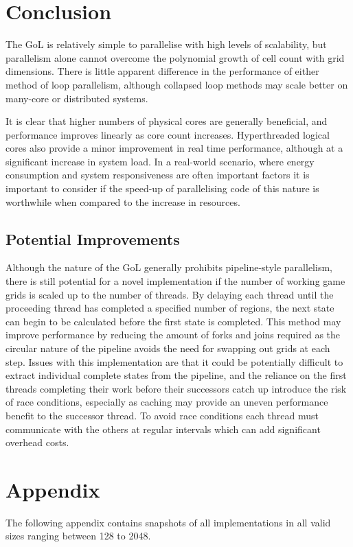 \documentclass[]{article}
\begin{document}
\section{Conclusion}
The GoL is relatively simple to parallelise with high levels of scalability, but parallelism alone cannot overcome the polynomial growth of cell count with grid dimensions. There is little apparent difference in the performance of either method of loop parallelism, although collapsed loop methods may scale better on many-core or distributed systems.

It is clear that higher numbers of physical cores are generally beneficial, and performance improves linearly as core count increases. Hyperthreaded logical cores also provide a minor improvement in real time performance, although at a significant increase in system load. In a real-world scenario, where energy consumption and system responsiveness are often important factors it is important to consider if the speed-up of parallelising code of this nature is worthwhile when compared to the increase in resources.

\subsection{Potential Improvements}
Although the nature of the GoL generally prohibits pipeline-style parallelism, there is still potential for a novel implementation if the number of working game grids is scaled up to the number of threads. By delaying each thread until the proceeding thread has completed a specified number of regions, the next state can begin to be calculated before the first state is completed. This method may improve performance by reducing the amount of forks and joins required as the circular nature of the pipeline avoids the need for swapping out grids at each step. Issues with this implementation are that it could be potentially difficult to extract individual complete states from the pipeline, and the reliance on the first threads completing their work before their successors catch up introduce the risk of race conditions, especially as caching may provide an uneven performance benefit to the successor thread. To avoid race conditions each thread must communicate with the others at regular intervals which can add significant overhead costs.


\section{Appendix}
The following appendix contains snapshots of all implementations in all valid sizes ranging between 128 to 2048.
\end{document}
